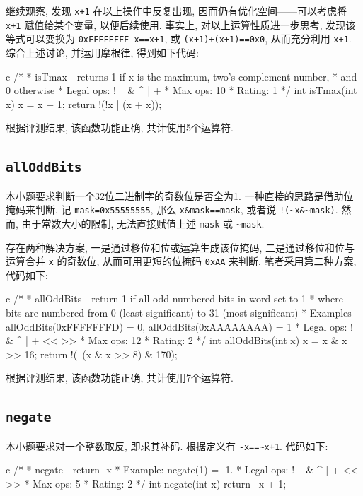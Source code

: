 继续观察, 发现 \verb|x+1| 在以上操作中反复出现, 因而仍有优化空间——可以考虑将 \verb|x+1| 赋值给某个变量, 以便后续使用. 事实上, 对以上运算性质进一步思考, 发现该等式可以变换为 \verb|0xFFFFFFFF-x==x+1|, 或 \verb|(x+1)+(x+1)==0x0|, 从而充分利用 \verb|x+1|. 综合上述讨论, 并运用摩根律, 得到如下代码: 



\begin{code}{c}
/*
 * isTmax - returns 1 if x is the maximum, two's complement number,
 *     and 0 otherwise
 *   Legal ops: ! ~ & ^ | +
 *   Max ops: 10
 *   Rating: 1
 */
int isTmax(int x) {
  x = x + 1;
  return !(!x | (x + x));
}
\end{code}

根据评测结果, 该函数功能正确, 共计使用5个运算符.

\subsection{\texttt{allOddBits}}

本小题要求判断一个32位二进制字的奇数位是否全为1. 一种直接的思路是借助位掩码来判断, 记 \verb|mask=0x55555555|, 那么 \verb|x&mask==mask|, 或者说 \verb|!(~x&~mask)|. 然而, 由于常数大小的限制, 无法直接赋值上述 \verb|mask| 或 \verb|~mask|.

存在两种解决方案, 一是通过移位和位或运算生成该位掩码, 二是通过移位和位与运算合并 \verb|x| 的奇数位, 从而可用更短的位掩码 \verb|0xAA| 来判断. 笔者采用第二种方案, 代码如下:

\begin{code}{c}
/*
 * allOddBits - return 1 if all odd-numbered bits in word set to 1
 *   where bits are numbered from 0 (least significant) to 31 (most significant)
 *   Examples allOddBits(0xFFFFFFFD) = 0, allOddBits(0xAAAAAAAA) = 1
 *   Legal ops: ! ~ & ^ | + << >>
 *   Max ops: 12
 *   Rating: 2
 */
int allOddBits(int x) {
  x = x & x >> 16;
  return !(~(x & x >> 8) & 170);
}
\end{code}

根据评测结果, 该函数功能正确, 共计使用7个运算符.

\subsection{\texttt{negate}}

本小题要求对一个整数取反, 即求其补码. 根据定义有 \verb|-x==~x+1|. 代码如下:

\begin{code}{c}
/*
 * negate - return -x
 *   Example: negate(1) = -1.
 *   Legal ops: ! ~ & ^ | + << >>
 *   Max ops: 5
 *   Rating: 2
 */
int negate(int x) { return ~x + 1; }
\end{code}

